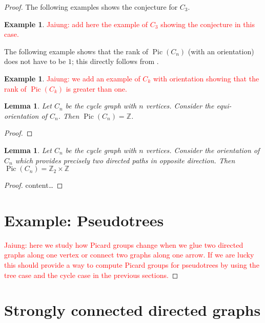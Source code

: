 \documentclass[11pt,reqno]{amsart}
\DeclareMathOperator{\Pic}{Pic}
\theoremstyle{definition}
\newtheorem{myeg}[mydef]{\textbf{Example}}
\theoremstyle{plain}
\newtheorem{lem}[mydef]{\textbf{Lemma}}
\begin{document}
\begin{proof}
The following examples shows the conjecture for $C_3$.

\begin{myeg}
\textcolor{red}{Jaiung: add here the example of $C_3$ showing the conjecture in this case.}
\end{myeg}

The following example shows that the rank of $\Pic(C_n)$ (with an orientation) does not have to be $1$; this directly follows from \cite[Corollary 3.5]{wagner2000critical}.

\begin{myeg}
\textcolor{red}{Jaiung: we add an example of $C_k$ with orientation showing that the rank of $\Pic(C_k)$ is greater than one. }
\end{myeg}

\begin{lem}
Let $C_n$ be the cycle graph with $n$ vertices. Consider the equi-orientation of $C_n$. Then $\Pic(C_n)=\mathbb{Z}$.
\end{lem}
\begin{proof}

\end{proof}

\begin{lem}
Let $C_n$ be the cycle graph with $n$ vertices. Consider the orientation of $C_n$ which provides precisely two directed paths in opposite direction. Then $\Pic(C_n)=\mathbb{Z}_2 \times \mathbb{Z}$
\end{lem}
\begin{proof}
	content\ldots
\end{proof}



\section{Example: Pseudotrees}

\textcolor{red}{Jaiung: here we study how Picard groups change when we glue two directed graphs along one vertex or connect two graphs along one arrow. If we are lucky this should provide a way to compute Picard groups for pseudotrees by using the tree case and the cycle case in the previous sections.}


\end{proof}


\section{Strongly connected directed graphs}



\end{document}
